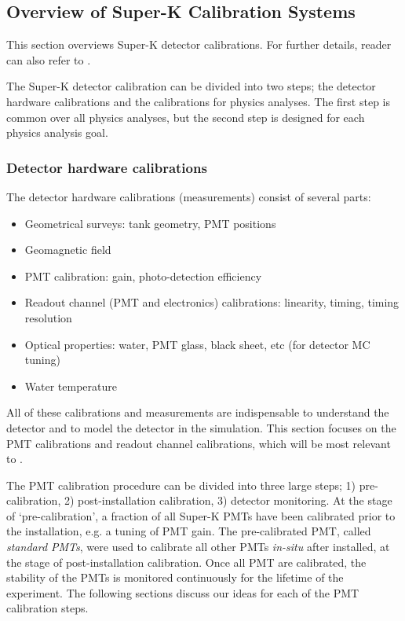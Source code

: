 \subsection{Overview of Super-K Calibration Systems}


This section overviews Super-K detector calibrations.
For further details, reader can also refer to \cite{Fukuda:2002uc, SK_calib_paper}.

The Super-K detector calibration can be divided into two steps;
the detector hardware calibrations and the calibrations for physics analyses.
The first step is common over all physics analyses, but the second step is
designed for each physics analysis goal.

\subsubsection{Detector hardware calibrations}

The detector hardware calibrations (measurements) consist of several parts:
\begin{itemize}
  \item Geometrical surveys: tank geometry, PMT positions
  \item Geomagnetic field
  \item PMT calibration: gain, photo-detection efficiency
  \item Readout channel (PMT and electronics) calibrations: linearity, timing, timing resolution
  \item Optical properties: water, PMT glass, black sheet, etc (for detector MC tuning)
  \item Water temperature
\end{itemize}
All of these calibrations and measurements are indispensable to understand the detector and
to model the detector in the simulation.
%
This section focuses on the PMT calibrations and readout channel calibrations, which
will be most relevant to \nuprismlite.

The PMT calibration procedure can be divided into three large steps;
1) pre-calibration, 2) post-installation calibration, 3) detector monitoring.
At the stage of `pre-calibration', a fraction of all Super-K PMTs have been
calibrated prior to the installation, e.g. a tuning of PMT gain.
The pre-calibrated PMT, called {\it standard PMTs}, were used to calibrate all
other PMTs {\it in-situ} after installed, at the stage of post-installation calibration.
Once all PMT are calibrated, the stability of the PMTs is monitored continuously
for the lifetime of the experiment.
%
The following sections discuss our ideas for each of the PMT
calibration steps.

